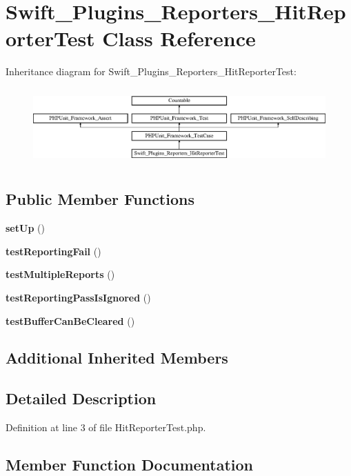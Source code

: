 \section{Swift\+\_\+\+Plugins\+\_\+\+Reporters\+\_\+\+Hit\+Reporter\+Test Class Reference}
\label{class_swift___plugins___reporters___hit_reporter_test}
Inheritance diagram for Swift\+\_\+\+Plugins\+\_\+\+Reporters\+\_\+\+Hit\+Reporter\+Test\+:\begin{figure}[H]
\begin{center}
\leavevmode
\includegraphics[height=2.974767cm]{class_swift___plugins___reporters___hit_reporter_test}
\end{center}
\end{figure}
\subsection*{Public Member Functions}
\begin{DoxyCompactItemize}
\item 
{\bf set\+Up} ()
\item 
{\bf test\+Reporting\+Fail} ()
\item 
{\bf test\+Multiple\+Reports} ()
\item 
{\bf test\+Reporting\+Pass\+Is\+Ignored} ()
\item 
{\bf test\+Buffer\+Can\+Be\+Cleared} ()
\end{DoxyCompactItemize}
\subsection*{Additional Inherited Members}


\subsection{Detailed Description}


Definition at line 3 of file Hit\+Reporter\+Test.\+php.



\subsection{Member Function Documentation}
